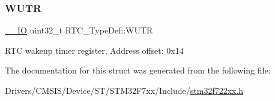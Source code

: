 \subsubsection{\texorpdfstring{WUTR}{WUTR}}
{\footnotesize\ttfamily \mbox{\hyperlink{core__sc300_8h_aec43007d9998a0a0e01faede4133d6be}{\+\_\+\+\_\+\+IO}} uint32\+\_\+t R\+T\+C\+\_\+\+Type\+Def\+::\+W\+U\+TR}

R\+TC wakeup timer register, Address offset\+: 0x14 

The documentation for this struct was generated from the following file\+:\begin{DoxyCompactItemize}
\item 
Drivers/\+C\+M\+S\+I\+S/\+Device/\+S\+T/\+S\+T\+M32\+F7xx/\+Include/\mbox{\hyperlink{stm32f722xx_8h}{stm32f722xx.\+h}}\end{DoxyCompactItemize}
